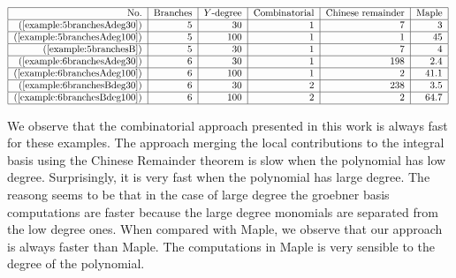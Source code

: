 \documentclass[a4paper,11pt]{amsart}%
\theoremstyle{definition}
\theoremstyle{plain}
\theoremstyle{remark}
\begin{document}
\[%
\begin{tabular}
[c]{|r|r|r|r|r|r|}\hline
No. & Branches & $Y$-degree & Combinatorial & Chinese remainder & Maple          \\ \hline
(\ref{example:5branchesAdeg30})   & 5 & $30$  & $1$   & $7$   & $3$       \\ \hline
(\ref{example:5branchesAdeg100})  & 5 & $100$ & $1$   & $1$   & $45$      \\ \hline
(\ref{example:5branchesB})        & 5 & $30$  & $1$   & $7$   & $4$       \\ \hline
(\ref{example:6branchesAdeg30})   & 6 & $30$  & $1$   & $198$ & $2.4$     \\ \hline
(\ref{example:6branchesAdeg100})  & 6 & $100$ & $1$   & $2$   & $41.1$    \\ \hline
(\ref{example:6branchesBdeg30})   & 6 & $30$  & $2$   & $238$ & $3.5$     \\ \hline
(\ref{example:6branchesBdeg100})  & 6 & $100$ & $2$   & $2$   & $64.7$    \\ \hline
\end{tabular}
\
\]

We observe that the combinatorial approach presented in this work is always fast for these examples. The approach merging the local contributions to the integral basis using the Chinese Remainder theorem is slow when the polynomial has low degree. Surprisingly, it is very fast when the polynomial has large degree. The reasong seems to be that in the case of large degree the groebner basis computations are faster because the large degree monomials are separated from the low degree ones. When compared with Maple, we observe that our approach is always faster than Maple. The computations in Maple is very sensible to the degree of the polynomial.



\end{document}
